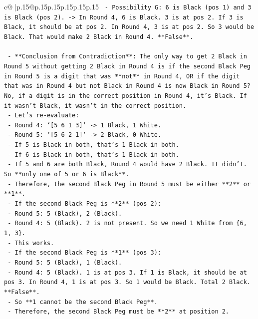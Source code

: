 \documentclass{article}
\begin{document}
{\begin{supertabular}{c@{$\;$}|p{.15\linewidth}@{}p{.15\linewidth}p{.15\linewidth}p{.15\linewidth}p{.15\linewidth}p{.15\linewidth}}
{{{\texttt{        {-} Possibility G: 6 is Black (pos 1) and 3 is Black (pos 2). {-}> In Round 4, 6 is Black. 3 is at pos 2. If 3 is Black, it should be at pos 2. In Round 4, 3 is at pos 2. So 3 would be Black. That would make 2 Black in Round 4. **False**.} \\
\\ 
\texttt{    {-} **Conclusion from Contradiction**: The only way to get 2 Black in Round 5 without getting 2 Black in Round 4 is if the second Black Peg in Round 5 is a digit that was **not** in Round 4, OR if the digit that was in Round 4 but not Black in Round 4 is now Black in Round 5? No, if a digit is in the correct position in Round 4, it's Black. If it wasn't Black, it wasn't in the correct position.} \\
\texttt{    {-} Let's re{-}evaluate:} \\
\texttt{        {-} Round 4: `{[}5 6 1 3{]}` {-}> 1 Black, 1 White.} \\
\texttt{        {-} Round 5: `{[}5 6 2 1{]}` {-}> 2 Black, 0 White.} \\
\texttt{        {-} If 5 is Black in both, that's 1 Black in both.} \\
\texttt{        {-} If 6 is Black in both, that's 1 Black in both.} \\
\texttt{        {-} If 5 and 6 are both Black, Round 4 would have 2 Black. It didn't. So **only one of 5 or 6 is Black**.} \\
\texttt{        {-} Therefore, the second Black Peg in Round 5 must be either **2** or **1**.} \\
\texttt{        {-} If the second Black Peg is **2** (pos 2):} \\
\texttt{            {-} Round 5: 5 (Black), 2 (Black).} \\
\texttt{            {-} Round 4: 5 (Black). 2 is not present. So we need 1 White from \{6, 1, 3\}.} \\
\texttt{            {-} This works.} \\
\texttt{        {-} If the second Black Peg is **1** (pos 3):} \\
\texttt{            {-} Round 5: 5 (Black), 1 (Black).} \\
\texttt{            {-} Round 4: 5 (Black). 1 is at pos 3. If 1 is Black, it should be at pos 3. In Round 4, 1 is at pos 3. So 1 would be Black. Total 2 Black. **False**.} \\
\texttt{            {-} So **1 cannot be the second Black Peg**.} \\
\texttt{        {-} Therefore, the second Black Peg must be **2** at position 2.} \\
}}}
\end{supertabular}}
\end{document}
